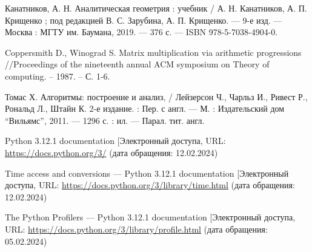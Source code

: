 \renewcommand\bibname{\centerline{СПИСОК ИСПОЛЬЗОВАННЫХ ИСТОЧНИКОВ}}

\begin{thebibliography}{3}
	\makeatletter
	\def\@biblabel#1{#1. }
	
	Канатников, А. Н. Аналитическая геометрия : учебник / А. Н. Канатников, А. П. Крищенко ; под редакцией В. С. Зарубина, А. П. Крищенко. — 9-е изд. — Москва : МГТУ им. Баумана, 2019. — 376 с. — ISBN 978-5-7038-4904-0.
	
	Coppersmith D., Winograd S. Matrix multiplication via arithmetic progressions //Proceedings of the nineteenth annual ACM symposium on Theory of computing. – 1987. – С. 1-6.
	
	Томас Х. Алгоритмы: построение и анализ, / Лейзерсон Ч., Чарльз И., Ривест Р., Рональд Л., Штайн К. 2-е издание. : Пер. с англ. — М. : Издательский дом “Вильямс”, 2011. — 1296 с. : ил. — Парал. тит. англ. 
	
	Python 3.12.1 documentation [Электронный \text{ресурс]. -- Режим} доступа, URL: \url{https://docs.python.org/3/} (дата обращения: 12.02.2024)

	Time access and conversions — Python 3.12.1 documentation [Электронный \text{ресурс]. -- Режим} доступа, URL: \url{https://docs.python.org/3/library/time.html} (дата обращения: 12.02.2024)
	
	The Python Profilers — Python 3.12.1 documentation [Электронный \text{ресурс]. -- Режим} доступа, URL: \url{https://docs.python.org/3/library/profile.html} (дата обращения: 05.02.2024)
\end{thebibliography}